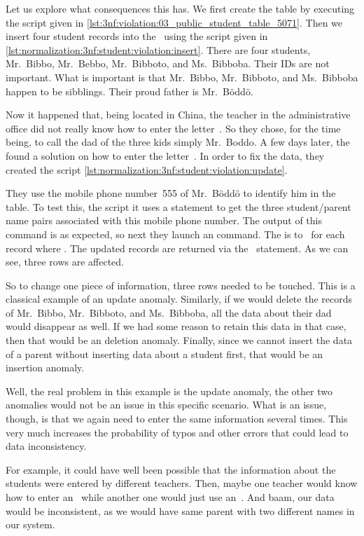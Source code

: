 Let us explore what consequences this has.
We first create the table by executing the script given in \cref{lst:3nf:violation:03_public_student_table_5071}.
Then we insert four student records into the \db\ using the script given in \cref{lst:normalization:3nf:student:violation:insert}.
There are four students, Mr.~Bibbo, Mr.~Bebbo, Mr.~Bibboto, and Ms.~Bibboba.
Their IDs are not important.
What is important is that Mr.~Bibbo, Mr.~Bibboto, and Ms.~Bibboba happen to be sibblings.
Their proud father is Mr.~B{\"o}dd{\"o}.

Now it happened that, being located in China, the teacher in the administrative office did not really know how to enter the letter~.
So they chose, for the time being, to call the dad of the three kids simply Mr.~Boddo.
A few days later, the found a solution on how to enter the letter~.
In order to fix the data, they created the script \cref{lst:normalization:3nf:student:violation:update}.

They use the mobile phone number~555 of Mr.~B{\"o}dd{\"o} to identify him in the table.
To test this, the script it uses a  statement to get the three student/parent name pairs associated with this mobile phone number.
The output of this command is as expected, so next they launch an  command.
The  is  to~ for each record where .
The updated records are returned via the~ statement.
As we can see, three rows are affected.

So to change one piece of information, three rows needed to be touched.
This is a classical example of an update anomaly.
Similarly, if we would delete the records of Mr.~Bibbo, Mr.~Bibboto, and Ms.~Bibboba, all the data about their dad would disappear as well.
If we had some reason to retain this data in that case, then that would be an deletion anomaly.
Finally, since we cannot insert the data of a parent without inserting data about a student first, that would be an insertion anomaly.

Well, the real problem in this example is the update anomaly, the other two anomalies would not be an issue in this specific scenario.
What is an issue, though, is that we again need to enter the same information several times.
This very much increases the probability of typos and other errors that could lead to data inconsistency.

For example, it could have well been possible that the information about the students were entered by different teachers.
Then, maybe one teacher would know how to enter an~ while another one would just use an~.
And baam, our data would be inconsistent, as we would have same parent with two different names in our system.%
%
\FloatBarrier%
\endhsection%
%
